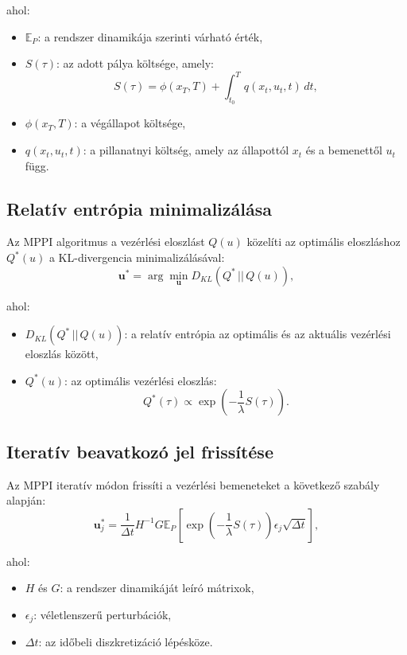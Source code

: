 ahol:
\begin{itemize}
    \item \( \mathbb{E}_P \): a rendszer dinamikája szerinti várható érték,
    \item \( S(\tau) \): az adott pálya költsége, amely:
    \begin{equation}
    S(\tau) = \phi(x_T, T) + \int_{t_0}^T q(x_t, u_t, t) \, dt,
    \end{equation}
    \item \( \phi(x_T, T) \): a végállapot költsége,
    \item \( q(x_t, u_t, t) \): a pillanatnyi költség, amely az állapottól \(x_t\) és a bemenettől \(u_t\) függ.
\end{itemize}

\subsection{Relatív entrópia minimalizálása}
Az MPPI algoritmus a vezérlési eloszlást \( Q(u) \) közelíti az optimális eloszláshoz \( Q^*(u) \) a KL-divergencia minimalizálásával:
\begin{equation}
\mathbf{u}^* = \arg\min_{\mathbf{u}} D_{KL}(Q^* \,||\, Q(u)),
\end{equation}

ahol:
\begin{itemize}
    \item \( D_{KL}(Q^* \,||\, Q(u)) \): a relatív entrópia az optimális és az aktuális vezérlési eloszlás között,
    \item \( Q^*(u) \): az optimális vezérlési eloszlás:
    \begin{equation}
    Q^*(\tau) \propto \exp\left(-\frac{1}{\lambda} S(\tau)\right).
    \end{equation}
\end{itemize}

\subsection{Iteratív beavatkozó jel frissítése}
Az MPPI iteratív módon frissíti a vezérlési bemeneteket a következő szabály alapján:
\begin{equation}
\mathbf{u}_j^* = \frac{1}{\Delta t} H^{-1} G \mathbb{E}_P \left[ \exp\left(-\frac{1}{\lambda} S(\tau)\right) \epsilon_j \sqrt{\Delta t} \right],
\end{equation}

ahol:
\begin{itemize}
    \item \( H \) és \( G \): a rendszer dinamikáját leíró mátrixok,
    \item \( \epsilon_j \): véletlenszerű perturbációk,
    \item \( \Delta t \): az időbeli diszkretizáció lépésköze.
\end{itemize}

